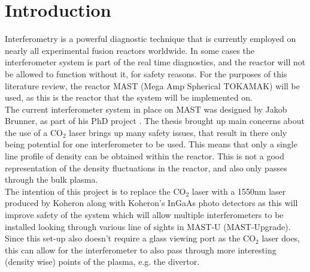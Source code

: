 \documentclass[12pt,a4paper,oneside]{report}
\begin{document}
\tableofcontents
\pagebreak
\clearpage
{}



\chapter{Introduction}
Interferometry is a powerful diagnostic technique that is currently employed on nearly all experimental fusion reactors worldwide. In some cases the interferometer system is part of the real time diagnostics, and the reactor will not be allowed to function without it, for safety reasons. For the purposes of this literature review, the reactor MAST (Mega Amp Spherical TOKAMAK) will be used, as this is the reactor that the system will be implemented on.\\
The current interferometer system in place on MAST was designed by Jakob Brunner, as part of his PhD project \cite{Brunner2017}. The thesis brought up main concerns about the use of a CO$_{2}$ laser brings up many safety issues, that result in there only being potential for one interferometer to be used. This means that only a single line profile of density can be obtained within the reactor. This is not a good representation of the density fluctuations in the reactor, and also only passes through the bulk plasma.\\
The intention of this project is to replace the CO$_{2}$ laser with a 1550nm laser produced by Koheron \cite{KoheronLaserV1} along with Koheron's InGaAs photo detectors \cite{KoheronPD100Photodetector} as this will improve safety of the system which will allow multiple interferometers to be installed looking through various line of sights in MAST-U (MAST-Upgrade). Since this set-up also doesn't require a glass viewing port as the CO$_{2}$ laser does, this can allow for the interferometer to also pass through more interesting (density wise) points of the plasma, e.g. the divertor.
\end{document}
